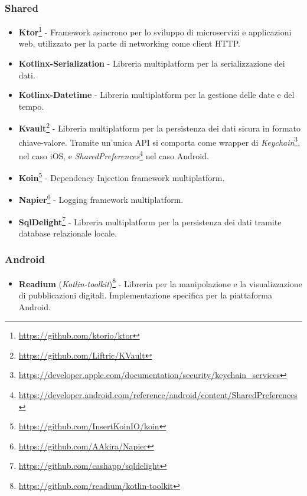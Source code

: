 \subsubsection*{Shared}
\begin{itemize} 
    \item \textbf{Ktor}\footnote{\href{https://github.com/ktorio/ktor}{https://github.com/ktorio/ktor}} - Framework asincrono per lo sviluppo di microservizi e applicazioni web, utilizzato per la parte di networking come client HTTP.
    
    \item \textbf{Kotlinx-Serialization} - Libreria multiplatform per la serializzazione dei dati.
    
    \item \textbf{Kotlinx-Datetime} - Libreria multiplatform per la gestione delle date e del tempo.
    
    \item \textbf{Kvault}\footnote{\href{https://github.com/Liftric/KVault}{https://github.com/Liftric/KVault}} - Libreria multiplatform per la persistenza dei dati sicura in formato chiave-valore. Tramite un'unica API si comporta come wrapper di \textit{Keychain}\footnote{\href{https://developer.apple.com/documentation/security/keychain\_services}{https://developer.apple.com/documentation/security/keychain\_services}}, nel caso iOS, e \textit{SharedPreferences}\footnote{\href{https://developer.android.com/reference/android/content/SharedPreferences}{https://developer.android.com/reference/android/content/SharedPreferences}} nel caso Android.
    
    \item \textbf{Koin}\footnote{\href{https://github.com/InsertKoinIO/koin}{https://github.com/InsertKoinIO/koin}} - Dependency Injection framework multiplatform.
    
    \item \textbf{Napier}\footnote{\href{https://github.com/AAkira/Napier}{https://github.com/AAkira/Napier}} - Logging framework multiplatform.
    
    \item \textbf{SqlDelight}\footnote{\href{https://github.com/cashapp/sqldelight}{https://github.com/cashapp/sqldelight}} - Libreria multiplatform per la persistenza dei dati tramite database relazionale locale.
\end{itemize}

\subsubsection*{Android}
\begin{itemize}
    \item \textbf{Readium} (\textit{Kotlin-toolkit})\footnote{\href{https://github.com/readium/kotlin-toolkit}{https://github.com/readium/kotlin-toolkit}} - Libreria per la manipolazione e la visualizzazione di pubblicazioni digitali. Implementazione specifica per la piattaforma Android. 
\end{itemize}


